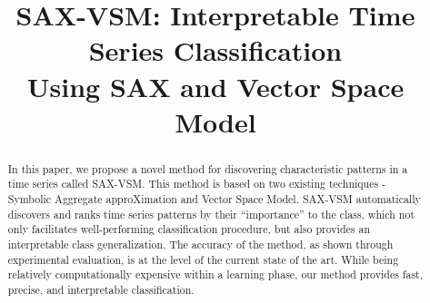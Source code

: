 \documentclass[conference]{IEEEtran}
\begin{document}
%
\title{\huge\textbf{SAX-VSM: Interpretable Time Series Classification\\ Using SAX and Vector Space Model}\vspace{-1ex}}
\author{
 \and
 \vspace{-2ex}}
\bigskip
\maketitle

\bigskip

\begin{abstract}
In this paper, we propose a novel method for discovering characteristic patterns 
in a time series called SAX-VSM. This method is based on two existing techniques - 
Symbolic Aggregate approXimation and Vector Space Model. SAX-VSM automatically 
discovers and ranks time series patterns by their “importance” to the class, which 
not only facilitates well-performing classification procedure, but also provides an 
interpretable class generalization. 
The accuracy of the method, as shown through experimental evaluation, is at the 
level of the current state of the art. 
While being relatively computationally expensive within a learning phase, 
our method provides fast, precise, and interpretable classification.
\end{abstract}
\end{document}
